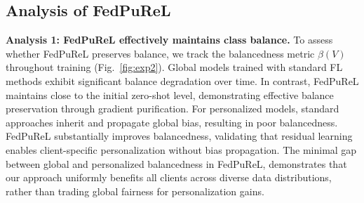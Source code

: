 \documentclass[10pt,twocolumn,letterpaper]{article}
\begin{document}
\subsection{Analysis of FedPuReL}
\label{Analysis of FedPuReL}

\noindent \textbf{\hypertarget{analysis:1}{Analysis 1}: FedPuReL effectively maintains class balance.}
To assess whether FedPuReL preserves balance, we track the balancedness metric $\beta(V)$ throughout training (Fig.~\ref{fig:exp2}). Global models trained with standard FL methods exhibit significant balance degradation over time. In contrast, FedPuReL maintains close to the initial zero-shot level, demonstrating effective balance preservation through gradient purification. For personalized models, standard approaches inherit and propagate global bias, resulting in poor balancedness. FedPuReL substantially improves balancedness, validating that residual learning enables client-specific personalization without bias propagation. The minimal gap between global and personalized balancedness in FedPuReL, demonstrates that our approach uniformly benefits all clients across diverse data distributions, rather than trading global fairness for personalization gains.
\end{document}

